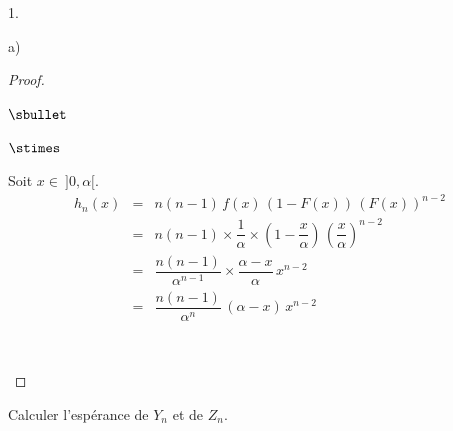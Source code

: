 \documentclass[11pt]{article}%
\begin{document}
\begin{noliste}{1.}
\begin{noliste}{a)}
\begin{proof}
\begin{noliste}{$\sbullet$}
\begin{noliste}{$\stimes$}
	  
	  
	  
	  \item Soit $x \in \ ]0,\alpha[$.
	  \[
	    \begin{array}{rcl}
	      h_n(x) & = & n(n-1) \, f(x) \, (1-F(x)) \, (F(x))^{n-2}
	      \\[.2cm]
	      & = & n(n-1) \times \dfrac{1}{\alpha} \times \left(1- 
	      \dfrac{x}{\alpha}
	      \right) \, \left( \dfrac{x}{\alpha}\right)^{n-2}
	      \\[.4cm]
	      & = & \dfrac{n(n-1)}{\alpha^{n-1}} \times 
	      \dfrac{\alpha - x}{\alpha} \, x^{n-2}
	      \\[.4cm]
	      & = & \dfrac{n(n-1)}{\alpha^{n}} \, (\alpha -x) \, 
	      x^{n-2}
	    \end{array}
	  \]
	\end{noliste}
	\conc{Finalement : $h_n : x \mapsto \left\{
	\begin{array}{cR{3cm}}
	  \dfrac{n(n-1)}{\alpha^{n}} \, (\alpha -x) \, x^{n-2}
	  & si $x \in \ ]0, \alpha[$
	  \nl
	  \nl[-.2cm]
	  0 & sinon
	\end{array}
	\right.$.}~\\[-1.4cm]
      \end{noliste}
    \end{proof}

    
    \item Calculer l'espérance de $Y_n$ et de $Z_n$.
  \end{noliste}
\end{noliste}
    
\end{document}
